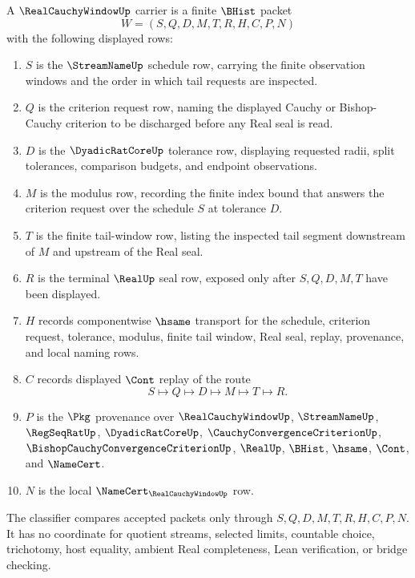 \begin{definition}
\label{def:real-cauchy-window-carrier}
A $\RealCauchyWindowUp$ carrier is a finite $\BHist$ packet
$$
W=(S,Q,D,M,T,R,H,C,P,N)
$$
with the following displayed rows:
\begin{enumerate}
\item $S$ is the $\StreamNameUp$ schedule row, carrying the finite observation windows and the order in which tail requests are inspected.
\item $Q$ is the criterion request row, naming the displayed Cauchy or Bishop-Cauchy criterion to be discharged before any Real seal is read.
\item $D$ is the $\DyadicRatCoreUp$ tolerance row, displaying requested radii, split tolerances, comparison budgets, and endpoint observations.
\item $M$ is the modulus row, recording the finite index bound that answers the criterion request over the schedule $S$ at tolerance $D$.
\item $T$ is the finite tail-window row, listing the inspected tail segment downstream of $M$ and upstream of the Real seal.
\item $R$ is the terminal $\RealUp$ seal row, exposed only after $S,Q,D,M,T$ have been displayed.
\item $H$ records componentwise $\hsame$ transport for the schedule, criterion request, tolerance, modulus, finite tail window, Real seal, replay, provenance, and local naming rows.
\item $C$ records displayed $\Cont$ replay of the route
$$
S \longmapsto Q \longmapsto D \longmapsto M \longmapsto T \longmapsto R .
$$
\item $P$ is the $\Pkg$ provenance over $\RealCauchyWindowUp$, $\StreamNameUp$, $\RegSeqRatUp$, $\DyadicRatCoreUp$, $\CauchyConvergenceCriterionUp$, $\BishopCauchyConvergenceCriterionUp$, $\RealUp$, $\BHist$, $\hsame$, $\Cont$, and $\NameCert$.
\item $N$ is the local $\NameCert_{\RealCauchyWindowUp}$ row.
\end{enumerate}
The classifier compares accepted packets only through $S,Q,D,M,T,R,H,C,P,N$. It has no coordinate for quotient streams, selected limits, countable choice, trichotomy, host equality, ambient Real completeness, Lean verification, or bridge checking.
\end{definition}

